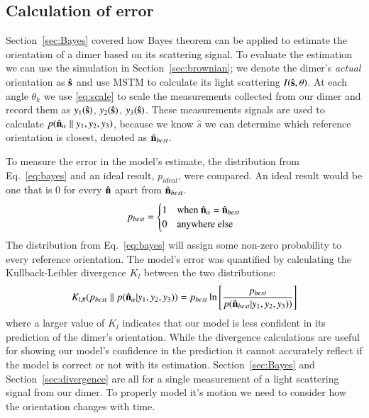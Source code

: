 \documentclass[final,  3p]{elsarticle}
\begin{document}
\subsection{Calculation of error
\label{sec:divergence}}


Section~\ref{sec:Bayes} covered how Bayes theorem can be applied to estimate
the orientation of a dimer based on its scattering signal. To evaluate the estimation we can use the simulation in Section~\ref{sec:brownian}; we denote the dimer's \emph{actual} orientation as $\hat{\bf s}$ and use MSTM to calculate its light scattering $I(\hat{\bf s}, \theta)$. At each angle $\theta_k$ we use \eqref{eq:scale} to scale the measurements collected from our dimer and record them as $y_1(\hat{\bf s})$, $y_2(\hat{\bf s})$, $y_3(\hat{\bf s})$. These measurements signals are used to calculate $p(\hat{\bf n}_{\alpha}\parallel y_1, y_2, y_3)$, because we know $\hat{s}$ we can determine which reference orientation is closest, denoted as $\hat{\bf n}_{best}$.

To measure the error in the model's estimate, the distribution from
Eq.~\eqref{eq:bayes} and an ideal result, $p_{ideal}$, were compared.
An ideal result would be one that is 0 for every $\hat{\bf n}$ apart
from $\hat{\bf n}_{best}$.
\begin{align}
	\label{eq:best}
	p_{best} = 
	\begin{cases}
		1 & \text{when $\hat{\bf n}_\alpha$ = $\hat{\bf n}_{best}$}\\
		0 & \text{anywhere else}
	\end{cases}
\end{align}
The distribution from Eq.~\eqref{eq:bayes} will assign some non-zero
probability to every reference orientation. The model's error was
quantified by calculating the Kullback-Leibler divergence $K_l$
between the two distributions:
\begin{align}
K_{l, \#}(p_{best}\parallel p(\hat{\bf n}_\alpha| y_1, y_2, y_3))
= p_{best}\ln \left[\frac{p_{best}}{p(\hat{\bf n}_{best}| y_1,y_2,y_3))}
\right]
\label{eq;kullback}
\end{align}
where a larger value of $K_l$ indicates that our model is less
confident in its prediction of the dimer's orientation. While the
divergence calculations are useful for showing our model's confidence
in the prediction it cannot accurately reflect if the model is correct
or not with its estimation.  Section~\ref{sec:Bayes} and
Section~\ref{sec:divergence} are all for a single measurement of a
light scattering signal from our dimer.  To properly model it's motion
we need to consider how the orientation changes with time.
\end{document}
